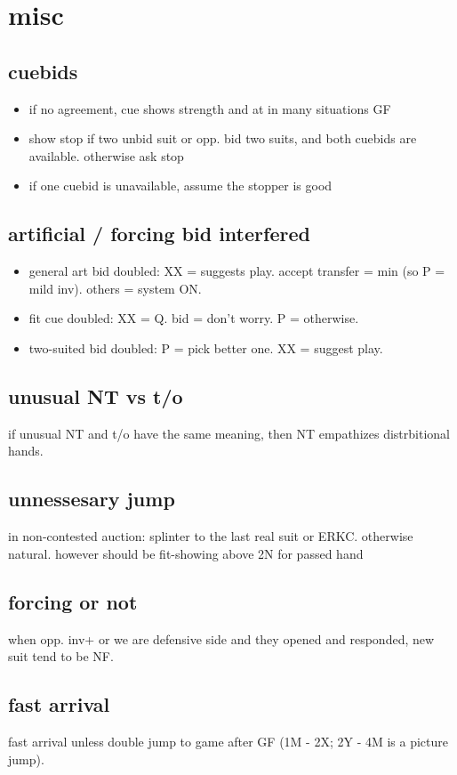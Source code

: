 \section{misc}

\subsection{cuebids}

\begin{itemize}
    \setlength\itemsep{0pt}
    \item if no agreement, cue shows strength and at in many situations GF
    \item show stop if two unbid suit or opp. bid two suits, and both cuebids are available. otherwise ask stop
    \item if one cuebid is unavailable, assume the stopper is good
\end{itemize}

\subsection{artificial / forcing bid interfered}

\begin{itemize}
    \setlength\itemsep{0pt}
    \item general art bid doubled: XX = suggests play. accept transfer = min (so P = mild inv). others = system ON.
    \item fit cue doubled: XX = Q. bid = don't worry. P = otherwise.
    \item two-suited bid doubled: P = pick better one. XX = suggest play.
\end{itemize}

\subsection{unusual NT vs t/o}

if unusual NT and t/o have the same meaning, then NT empathizes distrbitional hands.

\subsection{unnessesary jump}

in non-contested auction: splinter to the last real suit or ERKC.
otherwise natural. however should be fit-showing above 2N for passed hand

\subsection{forcing or not}

when opp. inv+ or we are defensive side and they opened and responded, new suit tend to be NF.

\subsection{fast arrival}

fast arrival unless double jump to game after GF (1M - 2X; 2Y - 4M is a picture jump).

